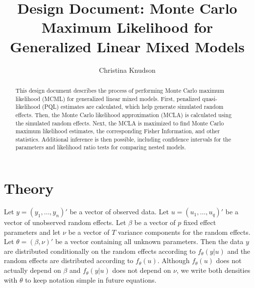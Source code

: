 \documentclass{article}
\title{Design Document: Monte Carlo Maximum Likelihood for Generalized Linear Mixed Models}
\author{Christina Knudson}
\begin{document}
\maketitle{}

\begin{abstract}
This design document describes the process of performing Monte Carlo maximum likelihood (MCML) for generalized linear mixed models.  First, penalized quasi-likelihood (PQL) estimates are calculated, which help generate simulated random effects. Then, the Monte Carlo likelihood approximation (MCLA)  is calculated using the simulated random effects. Next, the MCLA is maximized to find Monte Carlo maximum likelihood estimates, the corresponding Fisher Information, and other statistics. Additional inference is then possible, including confidence intervals for the parameters and likelihood ratio tests for comparing nested models.
\end{abstract}

\section{Theory}

Let $y=(y_1, \ldots, y_n)'$ be a vector of observed data. Let $u=(u_1,\ldots,u_q)'$ be a vector of unobserved random effects. Let $\beta$ be a vector of $p$ fixed effect parameters and let $\nu$ be a vector of $T$ variance components for the random effects. Let $\theta=(\beta ,  \nu)'$ be a vector containing all unknown parameters. Then the data $y$ are distributed conditionally on the random effects according to $f_\theta(y|u)$ and the random effects are distributed according to $f_\theta(u)$. Although $f_\theta(u)$ does not actually depend on $\beta$ and $f_\theta(y|u)$ does not depend on $\nu$, we write both densities with $\theta$ to keep notation simple in future equations.
\end{document}

